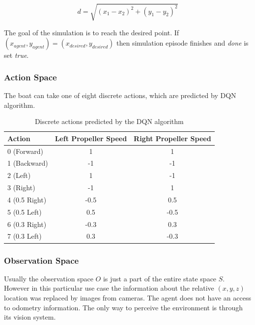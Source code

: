 \begin{equation}
    d = \sqrt{(x_1 - x_2)^2 + (y_1-y_2)^2}
\end{equation}

The goal of the simulation is to reach the desired point. If $(x_{agent}, y_{agent}) = (x_{desired}, y_{desired})$ then simulation episode finishes and \emph{done} is set \emph{true}. 

\subsubsection*{Action Space}
\label{sub2:action-space}

The boat can take one of eight discrete actions, which are predicted by DQN algorithm.

\vspace{.5cm}

\begin{table}[h]
\centering
\begin{tabular}{||l c c ||}
    \hline
     Action & Left Propeller Speed & Right Propeller Speed \\
     \hline\hline
     0 (Forward) & 1 & 1 \\
     1 (Backward) & -1 & -1 \\
     2 (Left) & 1 & -1 \\
     3 (Right) & -1 & 1 \\
     4 (0.5 Right) & -0.5 & 0.5 \\
     5 (0.5 Left) & 0.5 & -0.5 \\
     6 (0.3 Right) & -0.3 & 0.3 \\
     7 (0.3 Left) & 0.3 & -0.3 \\
    \hline
\end{tabular}
\caption{Discrete actions predicted by the DQN algorithm}
\label{tab:action-space}
\end{table}

\subsubsection*{Observation Space}
\label{sub2:observation-space}

Usually the observation space $O$ is just a part of the entire state space $S$. However in this particular use case the information about the relative $(x, y, z)$ location was replaced by images from cameras. The agent does not have an access to odometry information. The only way to perceive the environment is through its vision system.


